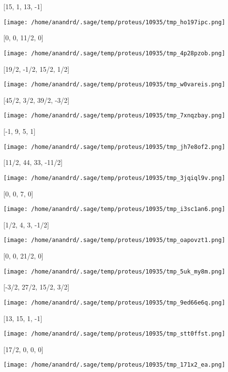 \documentclass[11pt]{article}
\begin{document}
[15, 1, 13, -1]
\begin{center}
\texttt{[image: /home/anandrd/.sage/temp/proteus/10935/tmp\_ho197ipc.png]}
\end{center}
[0, 0, 11/2, 0]
\begin{center}
\texttt{[image: /home/anandrd/.sage/temp/proteus/10935/tmp\_4p28pzob.png]}
\end{center}
[19/2, -1/2, 15/2, 1/2]
\begin{center}
\texttt{[image: /home/anandrd/.sage/temp/proteus/10935/tmp\_w0vareis.png]}
\end{center}
[45/2, 3/2, 39/2, -3/2]
\begin{center}
\texttt{[image: /home/anandrd/.sage/temp/proteus/10935/tmp\_7xnqzbay.png]}
\end{center}
[-1, 9, 5, 1]
\begin{center}
\texttt{[image: /home/anandrd/.sage/temp/proteus/10935/tmp\_jh7e8of2.png]}
\end{center}
[11/2, 44, 33, -11/2]
\begin{center}
\texttt{[image: /home/anandrd/.sage/temp/proteus/10935/tmp\_3jqiql9v.png]}
\end{center}
[0, 0, 7, 0]
\begin{center}
\texttt{[image: /home/anandrd/.sage/temp/proteus/10935/tmp\_i3sc1an6.png]}
\end{center}
[1/2, 4, 3, -1/2]
\begin{center}
\texttt{[image: /home/anandrd/.sage/temp/proteus/10935/tmp\_oapovzt1.png]}
\end{center}
[0, 0, 21/2, 0]
\begin{center}
\texttt{[image: /home/anandrd/.sage/temp/proteus/10935/tmp\_5uk\_my8m.png]}
\end{center}
[-3/2, 27/2, 15/2, 3/2]
\begin{center}
\texttt{[image: /home/anandrd/.sage/temp/proteus/10935/tmp\_9ed66e6q.png]}
\end{center}
[13, 15, 1, -1]
\begin{center}
\texttt{[image: /home/anandrd/.sage/temp/proteus/10935/tmp\_stt0ffst.png]}
\end{center}
[17/2, 0, 0, 0]
\begin{center}
\texttt{[image: /home/anandrd/.sage/temp/proteus/10935/tmp\_171x2\_ea.png]}
\end{center}
\end{document}
